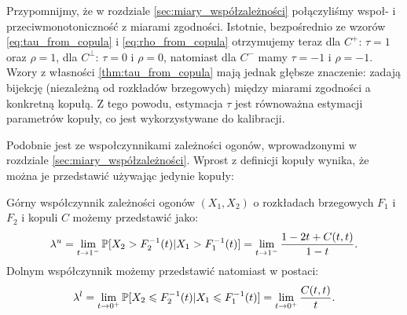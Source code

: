 Przypomnijmy, że w rozdziale \ref{sec:miary_współzależności} połączyliśmy wspoł- i przeciwmonotoniczność z miarami zgodności. Istotnie, bezpośrednio ze wzorów \ref{eq:tau_from_copula} i \ref{eq:rho_from_copula} otrzymujemy teraz dla $C^{+}$: $\tau=1$ oraz $\rho=1$, dla $C^{\perp}$: $\tau=0$ i $\rho=0$, natomiast dla $C^{-}$ mamy $\tau=-1$ i $\rho=-1$. Wzory z własności \ref{thm:tau_from_copula} mają jednak głębsze znaczenie: zadają bijekcję (niezależną od rozkładów brzegowych) między miarami zgodności a konkretną kopułą. Z tego powodu, estymacja $\tau$ jest równoważna estymacji parametrów kopuły, co jest wykorzystywane do kalibracji.

Podobnie jest ze wspołczynnikami zależności ogonów, wprowadzonymi w rozdziale \ref{sec:miary_współzależności}. Wprost z definicji kopuły wynika, że można je przedstawić używając jedynie kopuły:
\begin{prop}
		Górny współczynnik zależności ogonów $(X_1, X_2)$ o rozkładach brzegowych $F_1$ i $F_2$ i kopuli $C$ możemy przedstawić jako:
		$$ \lambda^{u} = \lim\limits_{t\to1^{-}}\mathbb{P}[X_2 > F_2^{-1}(t) \vert X_1 > F_1^{-1}(t) ] = \lim\limits_{t\to1^{-}}\frac{1-2t+C(t, t)}{1-t}.$$
		Dolnym współczynnik możemy przedstawić natomiast w postaci:
		$$ \lambda^{l} = \lim\limits_{t\to0^{+}}\mathbb{P}[X_2 \leqslant F_2^{-1}(t) \vert X_1 \leqslant F_1^{-1}(t) ] = \lim\limits_{t\to0^{+}}\frac{C(t, t)}{t}.$$
\end{prop}